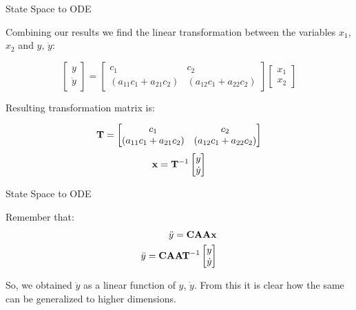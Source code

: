 \documentclass{beamer}
\begin{document}
\begin{frame}{State Space to ODE}
	\begin{flushleft}
		
		Combining our results we find the linear transformation between the variables $x_1$, $x_2$ and $y$, $\dot y$:
		
		\begin{equation}
			\begin{bmatrix}
				y \\ \dot y
			\end{bmatrix}
				= 
			\begin{bmatrix}
				c_1                                     & c_2 \\ 
				(a_{11}c_1 + a_{21}c_2) & (a_{12}c_1 + a_{22}c_2)
			\end{bmatrix} 
			\begin{bmatrix}
				x_1 \\ x_2
			\end{bmatrix}
		\end{equation}
		
		Resulting transformation matrix is:
		
		\begin{equation}
			\mathbf{T} = 
			\begin{bmatrix}
				c_1                                     & c_2 \\ 
				(a_{11}c_1 + a_{21}c_2) & (a_{12}c_1 + a_{22}c_2)
			\end{bmatrix} 
		\end{equation}
		\begin{equation}
			\mathbf{x}
			= 
			\mathbf{T}^{-1}
			\begin{bmatrix}
				y \\ 
				\dot y
			\end{bmatrix} 
		\end{equation}
		
	\end{flushleft}
\end{frame}



\begin{frame}{State Space to ODE}
	\begin{flushleft}
		
		Remember that:
		\begin{align}
			\ddot y = \mathbf{C} \mathbf{A} \mathbf{A} \mathbf{x}
			\\
			\ddot y = \mathbf{C} \mathbf{A} \mathbf{A} \mathbf{T}^{-1} 
			\begin{bmatrix}
				y \\ 
				\dot y
			\end{bmatrix}
		\end{align}
		
		So, we obtained $\ddot y$ as a linear function of $y$, $\dot y$.       From this it is clear how the same can be generalized to higher dimensions.
		
	\end{flushleft}
\end{frame}
\end{document}
